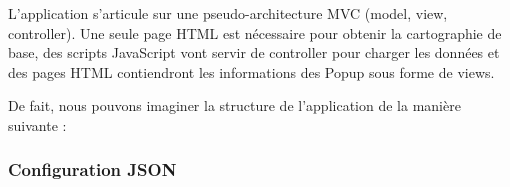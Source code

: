 L'application s'articule sur une pseudo-architecture MVC (model, view, controller). Une seule page HTML est nécessaire pour obtenir la cartographie de base, des scripts JavaScript vont servir de controller pour charger les données et des pages HTML contiendront les informations des Popup sous forme de views.

De fait, nous pouvons imaginer la structure de l'application de la manière suivante : 
\noindent{}





\subsubsection{Configuration JSON}


